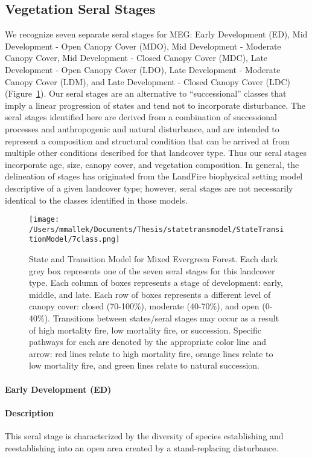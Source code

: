 \subsection*{Vegetation Seral Stages}
We recognize seven separate seral stages for MEG: Early Development (ED), Mid Development - Open Canopy Cover (MDO), Mid Development - Moderate Canopy Cover, Mid Development - Closed Canopy Cover (MDC), Late Development - Open Canopy Cover (LDO), Late Development - Moderate Canopy Cover (LDM), and Late Development - Closed Canopy Cover (LDC) (Figure~\ref{meg_transmodel}). Our seral stages are an alternative to ``successional'' classes that imply a linear progression of states and tend not to incorporate disturbance. The seral stages identified here are derived from a combination of successional processes and anthropogenic and natural disturbance, and are intended to represent a composition and structural condition that can be arrived at from multiple other conditions described for that landcover type. Thus our seral stages incorporate age, size, canopy cover, and vegetation composition. In general, the delineation of stages has originated from the LandFire biophysical setting model descriptive of a given landcover type; however, seral stages are not necessarily identical to the classes identified in those models.

\begin{figure}[htbp]
\centering
\texttt{[image: /Users/mmallek/Documents/Thesis/statetransmodel/StateTransitionModel/7class.png]}
\caption{State and Transition Model for Mixed Evergreen Forest. Each dark grey box represents one of the seven seral stages for this landcover type. Each column of boxes represents a stage of development: early, middle, and late. Each row of boxes represents a different level of canopy cover: closed (70-100\%), moderate (40-70\%), and open (0-40\%). Transitions between states/seral stages may occur as a result of high mortality fire, low mortality fire, or succession. Specific pathways for each are denoted by the appropriate color line and arrow: red lines relate to high mortality fire, orange lines relate to low mortality fire, and green lines relate to natural succession.} 
\label{meg_transmodel}
\end{figure}

\paragraph{Early Development (ED)}

\paragraph{Description} This seral stage is characterized by the diversity of species establishing and reestablishing into an open area created by a stand-replacing disturbance. 

